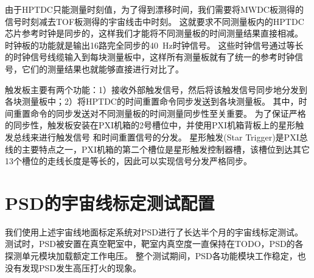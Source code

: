 由于HPTDC只能测量时刻值，为了得到漂移时间，我们需要将MWDC板测得的信号时刻减去TOF板测得的宇宙线击中时刻。
这就要求不同测量板内的HPTDC芯片参考时钟是同步的，这样我们才能将不同测量板的时间测量结果直接相减。
时钟板的功能就是输出16路完全同步的\SI{40}{Hz}时钟信号。
这些时钟信号通过等长的时钟信号线缆输入到每块测量板中，这样所有测量板就有了统一的参考时钟信号，它们的测量结果也就能够直接进行对比了。

触发板主要有两个功能：1）接收外部触发信号，然后将该触发信号同步地分发到各块测量板中；2）将HPTDC的时间重置命令同步发送到各块测量板。
其中，时间重置命令的同步发送对不同测量板的时间测量同步性至关重要。
为了保证严格的同步性，触发板安装在PXI机箱的2号槽位中，并使用PXI机箱背板上的星形触发总线来进行触发信号
和时间重置信号的分发。
星形触发(Star Trigger)是PXI总线的主要特点之一，PXI机箱的第二个槽位是星形触发控制器槽，该槽位到达其它13个槽位的走线长度是等长的，因此可以实现信号分发严格同步。


\section{PSD的宇宙线标定测试配置}

我们使用上述宇宙线地面标定系统对PSD进行了长达半个月的宇宙线标定测试。
测试时，PSD被安置在真空靶室中，靶室内真空度一直保持在TODO，PSD的各探测单元模块加载额定工作电压。
整个测试期间，PSD各功能模块工作稳定，也没有发现PSD发生高压打火的现象。

